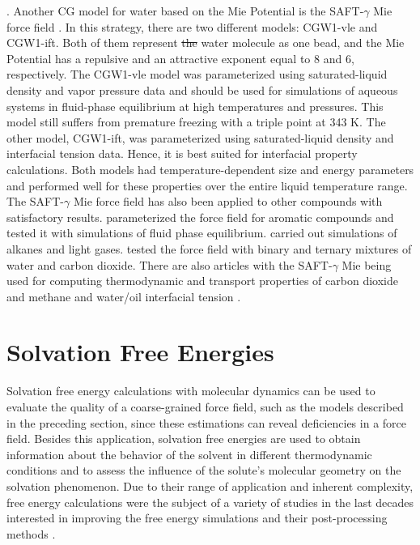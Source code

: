 \documentclass[
	12pt,				%
	openany,			%
	oneside,			%
	a4paper,			%
	english,			%
	brazil				%
	]{abntex2}
\providecommand{\DIFadd}[1]{{\protect\color{blue}\uwave{#1}}}
\providecommand{\DIFdel}[1]{{\protect\color{red}\sout{#1}}}
\providecommand{\DIFaddbegin}{}
\providecommand{\DIFaddend}{}
\providecommand{\DIFdelbegin}{}
\providecommand{\DIFdelend}{}
\providecommand{\DIFadd}[1]{{\protect\color{blue}\uwave{#1}}} %
\providecommand{\DIFdel}[1]{{\protect\color{red}\sout{#1}}}                      %
\providecommand{\DIFaddbegin}{} %
\providecommand{\DIFaddend}{} %
\providecommand{\DIFdelbegin}{} %
\providecommand{\DIFdelend}{} %
\begin{document}
{. }\DIFdelend Another CG model for water based on the Mie Potential is the SAFT-$\gamma$ Mie force field \cite{lobanova2015}. In this strategy, there are two different models: CGW1-vle and CGW1-ift. Both of them represent \DIFdelbegin \DIFdel{the }\DIFdelend \DIFaddbegin \DIFadd{one }\DIFaddend water molecule as one bead, and the Mie Potential has a repulsive and an attractive exponent equal to 8 and 6, respectively. The CGW1-vle model was parameterized using saturated-liquid density and vapor pressure data and should be used for simulations of aqueous systems in fluid-phase equilibrium at high temperatures and pressures. This model still suffers from premature freezing with a triple point at 343 K. The other model, CGW1-ift, was parameterized using saturated-liquid density and interfacial tension data. Hence, it is best suited for interfacial property calculations. Both models had temperature-dependent size and energy parameters and performed well for these properties over the entire liquid temperature range. The SAFT-$\gamma$ Mie force field has also been applied to other compounds with satisfactory results.  parameterized the force field for aromatic compounds and tested it with simulations of fluid phase equilibrium.  carried out simulations of alkanes and light gases.  tested the force field with binary and ternary mixtures of water and carbon dioxide. There are also articles with the SAFT-$\gamma$ Mie being used for computing thermodynamic and transport properties of carbon dioxide and methane \cite{cassiano1,cassiano2} and water/oil interfacial tension \cite{herdes2017}.  

\section{Solvation Free Energies}

Solvation free energy calculations with molecular dynamics can be used to evaluate the quality of a coarse-grained force field, such as the models described in the preceding section, since these estimations can reveal deficiencies in a force field. Besides this application, solvation free energies are used to obtain information about the behavior of the solvent in different thermodynamic conditions and to assess the influence of the solute's molecular geometry on the solvation phenomenon. Due to their range of application and inherent complexity, free energy calculations were the subject of a variety of studies in the last decades interested in improving the free energy simulations and their post-processing methods \cite{mbar,bareva,dexp,gdel}.
\end{document}
